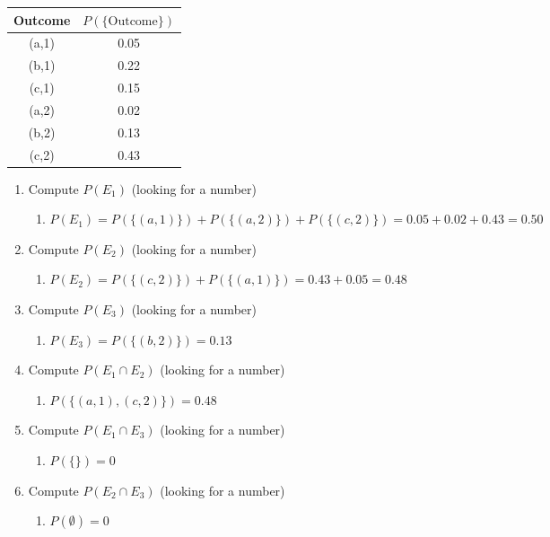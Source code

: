 \documentclass[krantz1,ChapterTOCs]{krantz}
\begin{document}
\begin{enumerate}
\begin{table}[ht!]
\begin{tabular}{ c c}
       Outcome &  $P(\{\text{Outcome}\})$\\
       \hline
            (a,1) & 0.05  \\
            (b,1) & 0.22 \\
            (c,1) & 0.15 \\
            (a,2) & 0.02 \\
            (b,2) & 0.13 \\
            (c,2) & 0.43 \\
       \end{tabular}
   \end{table}
   \begin{enumerate}
       \item Compute $P(E_{1})$ (looking for a number)
       \begin{enumerate}
           \item {\color{red} $P(E_{1}) = P(\{(a,1)\})+P(\{(a,2)\}) + P(\{(c,2)\}) = 0.05+0.02+0.43 = 0.50$    }
       \end{enumerate}
       \item Compute $P(E_{2})$ (looking for a number)
       \begin{enumerate}
           \item {\color{red}  $P(E_{2}) = P(\{(c,2)\})+P(\{(a,1)\}) = 0.43 + 0.05 = 0.48 $   }
       \end{enumerate}
       \item Compute $P(E_{3})$ (looking for a number)
       \begin{enumerate}
           \item {\color{red}  $P(E_{3}) = P(\{(b,2)\}) = 0.13 $    }
       \end{enumerate}
       \item Compute $P(E_{1} \cap E_{2})$ (looking for a number)
       \begin{enumerate}
           \item {\color{red} $P(\{ (a,1), (c,2) \} ) = 0.48$    }
       \end{enumerate}
       \item Compute $P(E_{1} \cap E_{3})$ (looking for a number)
       \begin{enumerate}
           \item {\color{red} $P(\{ \}) = 0$     }
       \end{enumerate}
       \item Compute $P(E_{2} \cap E_{3})$ (looking for a number)
       \begin{enumerate}
           \item {\color{red}  $P(\emptyset) = 0$   }

\end{enumerate}
\end{enumerate}
\end{enumerate}
\end{document}
